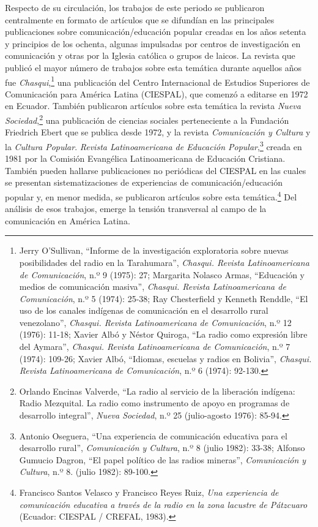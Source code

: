 \documentclass{tufte-handout}
\begin{document}
Respecto de su circulación, los trabajos de este periodo se publicaron
centralmente en formato de artículos que se difundían en las principales
publicaciones sobre comunicación/educación popular creadas en los años
setenta y principios de los ochenta, algunas impulsadas por centros de
investigación en comunicación y otras por la Iglesia católica o grupos
de laicos. La revista que publicó el mayor número de trabajos sobre esta
temática durante aquellos años fue \emph{Chasqui},\footnote{Jerry
  O'Sullivan, ``Informe de la investigación exploratoria sobre nuevas
  posibilidades del radio en la Tarahumara'', \emph{Chasqui. Revista
  Latinoamericana de Comunicación}, n.º 9 (1975): 27; Margarita Nolasco
  Armas, ``Educación y medios de comunicación masiva'', \emph{Chasqui.
  Revista Latinoamericana de Comunicación}, n.º 5 (1974): 25-38; Ray
  Chesterfield y Kenneth Renddle, ``El uso de los canales indígenas de
  comunicación en el desarrollo rural venezolano'', \emph{Chasqui.
  Revista Latinoamericana de Comunicación}, n.º 12 (1976): 11-18; Xavier
  Albó y Néstor Quiroga, ``La radio como expresión libre del Aymara'',
  \emph{Chasqui. Revista Latinoamericana de Comunicación}, n.º 7 (1974):
  109-26; Xavier Albó, ``Idiomas, escuelas y radios en Bolivia'',
  \emph{Chasqui. Revista Latinoamericana de Comunicación}, n.º 6 (1974):
  92-130.} una publicación del Centro Internacional de Estudios
Superiores de Comunicación para América Latina (CIESPAL), que comenzó a
editarse en 1972 en Ecuador. También publicaron artículos sobre esta
temática la revista \emph{Nueva Sociedad},\footnote{Orlando Encinas
  Valverde, ``La radio al servicio de la liberación indígena: Radio
  Mezquital. La radio como instrumento de apoyo en programas de
  desarrollo integral'', \emph{Nueva Sociedad}, n.º 25 (julio-agosto
  1976): 85-94.} una publicación de ciencias sociales perteneciente a la
Fundación Friedrich Ebert que se publica desde 1972, y la revista
\emph{Comunicación y Cultura} y la \emph{Cultura Popular}. \emph{Revista
Latinoamericana de Educación Popular},\footnote{Antonio Oseguera, ``Una
  experiencia de comunicación educativa para el desarrollo rural'',
  \emph{Comunicación y Cultura}, n.º 8 (julio 1982): 33-38; Alfonso
  Gumucio Dagron, ``El papel político de las radios mineras'',
  \emph{Comunicación y Cultura}, n.º 8. (julio 1982): 89-100.} creada en
1981 por la Comisión Evangélica Latinoamericana de Educación Cristiana.
También pueden hallarse publicaciones no periódicas del CIESPAL en las
cuales se presentan sistematizaciones de experiencias de
comunicación/educación popular y, en menor medida, se publicaron
artículos sobre esta temática.\footnote{Francisco Santos Velasco y
  Francisco Reyes Ruiz, \emph{Una experiencia de comunicación educativa
  a través de la radio en la zona lacustre de Pátzcuaro} (Ecuador:
  CIESPAL / CREFAL, 1983).} Del análisis de esos trabajos, emerge la
tensión transversal al campo de la comunicación en América Latina.
\end{document}
